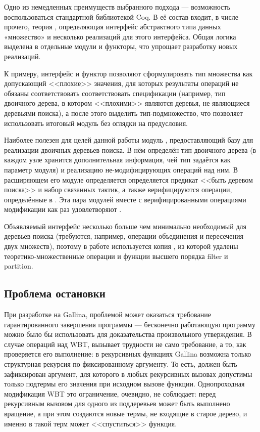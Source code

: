 \documentclass[a4paper,14pt]{extarticle}
\begin{document}
Одно из немедленных преимуществ выбранного подхода ---
возможность воспользоваться стандартной библиотекой Coq.
В её состав входит, в числе прочего, теория ,
определяющая интерфейс
абстрактного типа данных «множество»
и несколько реализаций для этого интерфейса.
Общая логика
выделена в отдельные модули и функторы,
что упрощает разработку новых реализаций.

К примеру, интерфейс 
и функтор 
позволяют сформулировать тип множества
как допускающий <<плохие>> значения,
для которых результаты операций
не обязаны соответствовать соответствовать спецификации
(например, тип двоичного дерева,
в котором <<плохими>> являются деревья,
не являющиеся деревьями поиска),
а после этого выделить тип-подмножество,
что позволяет использовать
итоговый модуль без оглядки на предусловия.

Наиболее полезен для целей данной работы
модуль ,
предоставляющий базу для
реализации двоичных деревьев поиска.
В нём определён тип двоичного дерева
(в каждом узле хранится дополнительная информация,
чей тип задаётся как параметр модуля)
и реализацию не-модифицирующих операций над ним.
В расширяющем его модуле
определяется определяется предикат
<<быть деревом поиска>> и набор связанных тактик,
а также верифицируются операции,
определённые в .
Эта пара модулей
вместе с 
верифицированными операциями модификации
как раз удовлетворяют .

Объявляемый  интерфейс
несколько больше чем минимально необходимый для деревьев поиска
(требуются, например, операции объединения и пересечения двух множеств),
поэтому в работе используется копия ,
из которой удалены теоретико-множественные операции и
функции высшего порядка filter и partition.

\subsection{Проблема остановки}

При разработке на Gallina,
проблемой может оказаться требование гарантированного завершения программы ---
бесконечно работающую программу можно было бы использовать
для доказательства произвольного утверждения.
В случае операций над WBT, вызывает трудности не само требование,
а то, как проверяется его выполнение:
в рекурсивных функциях Gallina
возможна только структурная рекурсия
по фиксированному аргументу.
То есть, должен быть зафиксирован аргумент,
для которого в любых рекурсивных вызовах
допустимы только подтермы его значения
при исходном вызове функции.
Однопроходная модификация WBT
это ограничение, очевидно, не соблюдает:
перед рекурсивным вызовом для одного из поддеревьев
может быть выполнено вращение,
а при этом создаются новые термы, не входящие в старое дерево,
и именно в такой терм может <<спуститься>> функция.
\end{document}

